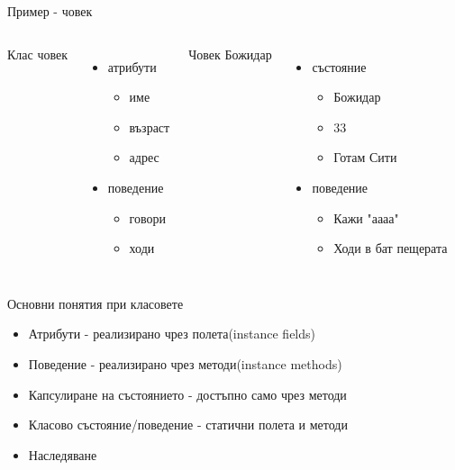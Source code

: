 \documentclass{beamer}
\begin{document}
\begin{frame}{Пример - човек}
  \begin{columns}
    Клас човек
    \begin{itemize}
      \item атрибути
        \begin{itemize}
          \item име
          \item възраст 
          \item адрес
        \end{itemize}
      \item поведение
        \begin{itemize}
          \item говори
          \item ходи
        \end{itemize}
    \end{itemize}

    Човек Божидар
    \begin{itemize}
    \item състояние
      \begin{itemize}
      \item Божидар
      \item 33 
      \item Готам Сити
      \end{itemize}
    \item поведение
      \begin{itemize}
      \item Кажи "аааа"
      \item Ходи в бат пещерата
      \end{itemize}
    \end{itemize}
  \end{columns}
\end{frame}

\begin{frame}{Основни понятия при класовете}
\transdissolve
\begin{itemize}
\item Атрибути - реализирано чрез полета(instance fields)
\item Поведение - реализирано чрез методи(instance methods)
\item Капсулиране на състоянието - достъпно само чрез методи
\item Класово състояние/поведение - статични полета и методи
\item Наследяване
\end{itemize}
\end{frame}
\end{document}
